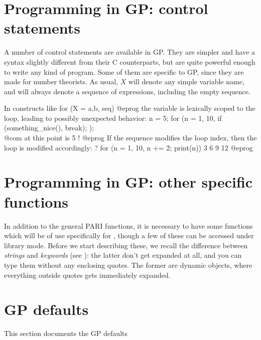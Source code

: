 \section{Programming in GP: control statements}
\label{se:programming}

  A number of control statements are available in GP. They are simpler and
have a syntax slightly different from their C counterparts, but are quite
powerful enough to write any kind of program. Some of them are specific to
GP, since they are made for number theorists. As usual, $X$ will denote any
simple variable name, and  will always denote a sequence of
expressions, including the empty sequence.

 In constructs like
\bprog
    for (X = a,b, seq)
@eprog\noindent
the variable  is lexically scoped to the loop, leading to possibly
unexpected behavior:
\bprog
    n = 5;
    for (n = 1, 10,
      if (something_nice(), break);
    );
    \\ @com at this point  is 5 !
@eprog\noindent
If the sequence  modifies the loop index, then the loop
is modified accordingly:
\bprog
    ? for (n = 1, 10, n += 2; print(n))
    3
    6
    9
    12
@eprog


\section{Programming in GP: other specific functions}
\label{se:gp_program}

  In addition to the general PARI functions, it is necessary to have some
functions which will be of use specifically for , though a few of these can
be accessed under library mode. Before we start describing these, we recall
the difference between \emph{strings} and \emph{keywords} (see
): the latter don't get expanded at all, and you can type
them without any enclosing quotes. The former are dynamic objects, where
everything outside quotes gets immediately expanded.


\section{GP defaults}
\label{se:gp_defaults} This section documents the GP defaults


\vfill\eject
